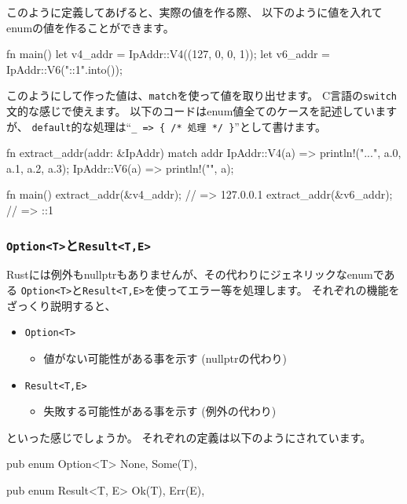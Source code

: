 \documentclass[mingoth,a4paper]{jsarticle}
\begin{document}
このように定義してあげると、実際の値を作る際、
以下のように値を入れてenumの値を作ることができます。

\begin{commandline}
fn main() {
    let v4_addr = IpAddr::V4((127, 0, 0, 1));
    let v6_addr = IpAddr::V6("::1".into());
}
\end{commandline}

このようにして作った値は、\texttt{match}を使って値を取り出せます。
C言語の\texttt{switch}文的な感じで使えます。
以下のコードはenum値全てのケースを記述していますが、
\texttt{default}的な処理は``\verb|_ => { /* 処理 */ }|''として書けます。

\begin{commandline}
fn extract_addr(addr: &IpAddr) {
    match addr {
        IpAddr::V4(a) => {
            println!("{}.{}.{}.{}", a.0, a.1, a.2, a.3);
        }
        IpAddr::V6(a) => {
            println!("{}", a);
        }
    }
}

fn main() {
    extract_addr(&v4_addr); // => 127.0.0.1
    extract_addr(&v6_addr); // => ::1
}
\end{commandline}

\subsubsection{\texttt{Option<T>}と\texttt{Result<T,E>}}

Rustには例外もnullptrもありませんが、その代わりにジェネリックなenumである
\texttt{Option<T>}と\texttt{Result<T,E>}を使ってエラー等を処理します。
それぞれの機能をざっくり説明すると、
\begin{itemize}
  \item \verb|Option<T>|
	\begin{itemize}
	 \item 値がない可能性がある事を示す (nullptrの代わり)
	\end{itemize}
 \item \verb|Result<T,E>|
       \begin{itemize}
	\item 失敗する可能性がある事を示す (例外の代わり)
       \end{itemize}
\end{itemize}
といった感じでしょうか。
それぞれの定義は以下のようにされています。

\begin{commandline}
pub enum Option<T> {
    None,
    Some(T),
}

pub enum Result<T, E> {
    Ok(T),
    Err(E),
}
\end{commandline}
\end{document}
